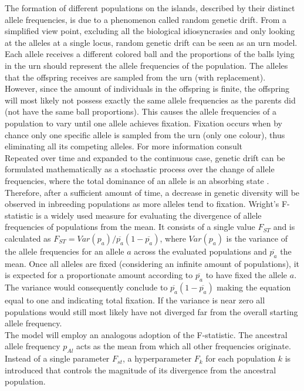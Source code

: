 \documentclass[a4paper, 11pt]{article}
\begin{document}
The formation of different populations on the islands, described by their distinct allele frequencies, is due to a phenomenon called random genetic drift. From a simplified view point, excluding all the biological idiosyncrasies and only looking at the alleles at a single locus, random genetic drift can be seen as an urn model. Each allele receives a different colored ball and the  proportions of the balls lying in the urn should represent the allele frequencies of the population. The alleles that the offspring receives are sampled from the urn (with replacement). However, since the amount of individuals in the offspring is finite, the offspring will most likely not possess exactly the same allele frequencies as the parents did (not have the same ball proportions). This causes the allele frequencies of a population to vary until one allele achieves fixation. Fixation occurs when by chance only one specific allele is sampled from the urn  (only one colour), thus eliminating all its competing alleles. For more information consult \parencite{hartl1997principles, gillespie2004population}\\
Repeated over time and expanded to the continuous case, genetic drift can be formulated mathematically as a stochastic process over the change of allele frequencies, where the total dominance of an allele is an absorbing state \parencite{crow1970introduction}. Therefore, after a sufficient amount of time, a decrease in genetic diversity will be observed in inbreeding populations as more alleles tend to fixation. Wright's F-statistic is a widely used measure for evaluating the divergence of allele frequencies of populations from the mean. It consists of a single value $F_{ST}$ and is calculated as $F_{ST} = Var(p_a) / \overline{p_a}(1-\overline{p_a})$, where $Var(p_a)$ is the variance of the allele frequencies for an allele $a$ across the evaluated populations and $\overline{p_a}$ the mean. Once all alleles are fixed (considering an infinite amount of populations), it is expected for a proportionate amount according to $\overline{p_a}$ to have fixed the allele $a$. The variance would consequently conclude to $\overline{p_a}(1-\overline{p_a})$ making the equation equal to one and indicating total fixation. If the variance is near zero all populations would still most likely have not diverged far from the overall starting allele frequency.\\

The model will employ an analogous adoption of the F-statistic. The ancestral allele frequency $p_{Al}$ acts as the mean from which all other frequencies originate. Instead of a single parameter $F_{st}$, a hyperparameter $F_k$ for each population $k$ is introduced that controls the magnitude of its divergence from the ancestral population.\\
\end{document}
